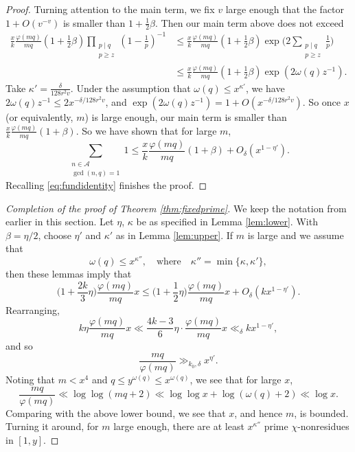 \documentclass{scrartcl}
\theoremstyle{plain}
\theoremstyle{remark}
\renewcommand{\phi}{\varphi}
\newcommand{\1}{\mathbf{1}}
\newcommand{\sA}{\mathcal{A}}
\begin{document}
\begin{proof}
Turning attention to the main term, we fix $v$ large enough that the factor $1+O(v^{-v})$ is smaller than $1+\frac{1}{2}\beta$. Then our main term above does not exceed
\begin{align*}  \frac{x}{k} \frac{\phi(mq)}{mq} \left(1+\frac{1}{2}\beta\right) \prod_{\substack{p \mid q\\ p \ge z}} \left(1-\frac{1}{p}\right)^{-1} &\le \frac{x}{k} \frac{\phi(mq)}{mq} \left(1+\frac{1}{2}\beta\right) \exp\bigg(2\sum_{\substack{p \mid q \\ p \ge z}}\frac{1}{p}\bigg) \\&\le \frac{x}{k} \frac{\phi(mq)}{mq} \left(1+\frac{1}{2}\beta\right) \exp(2\omega(q) z^{-1}). \end{align*}
Take $\kappa' = \frac{\delta}{128r^2 v}$. Under the assumption that $\omega(q) \le x^{\kappa'}$, we have $2 \omega(q) z^{-1} \le 2x^{-\delta/128r^2 v}$, and $\exp(2\omega(q) z^{-1}) = 1 + O(x^{-\delta/128r^2 v})$. So once $x$ (or equivalently, $m$) is large enough, our main term is smaller than $\frac{x}{k}\frac{\phi(mq)}{mq}(1+\beta)$. So we have shown that for large $m$,
\[ \sum_{\substack{n \in \sA \\ \gcd(n,q)=1}} 1 \le \frac{x}{k}\frac{\phi(mq)}{mq}(1+\beta) + O_{\delta}(x^{1-\eta'}). \]
Recalling \eqref{eq:fundidentity} finishes the proof.
\end{proof}



\begin{proof}[Completion of the proof of Theorem \ref{thm:fixedprime}] We keep the notation from earlier in this section. Let $\eta$, $\kappa$ be as specified in Lemma \ref{lem:lower}. With $\beta = \eta/2$, choose $\eta'$ and $\kappa'$ as in Lemma \ref{lem:upper}. If $m$ is large and we assume that
\[ \omega(q) \le x^{\kappa''}, \quad\text{where} \quad\kappa'' = \min\{\kappa,\kappa'\}, \]
then these lemmas imply that
\[ \bigg(1+\frac{2k}{3}\eta\bigg) \frac{\phi(mq)}{mq} x \le \bigg(1+\frac{1}{2}\eta\bigg) \frac{\phi(mq)}{mq} x + O_{\delta}(kx^{1-\eta'}). \]
Rearranging,
\[ k \eta \frac{\phi(mq)}{mq} x \ll \frac{4k-3}{6} \eta \cdot \frac{\phi(mq)}{mq}x \ll_{\delta} k x^{1-\eta'}, \]
and so
\[ \frac{mq}{\phi(mq)} \gg_{k_0,\delta} x^{\eta'}. \]
Noting that $m < x^{4}$ and $q \le y^{\omega(q)}\le x^{\omega(q)}$, we see that for large $x$,
\[ \frac{mq}{\phi(mq)} \ll \log\log(mq+2) \ll \log\log{x} + \log(\omega(q)+2) \ll \log{x}. \]
Comparing with the above lower bound, we see that $x$, and hence $m$, is bounded. Turning it around, for $m$ large enough, there are at least $x^{\kappa''}$ prime $\chi$-nonresidues in $[1,y]$.
\end{proof}
\end{document}
